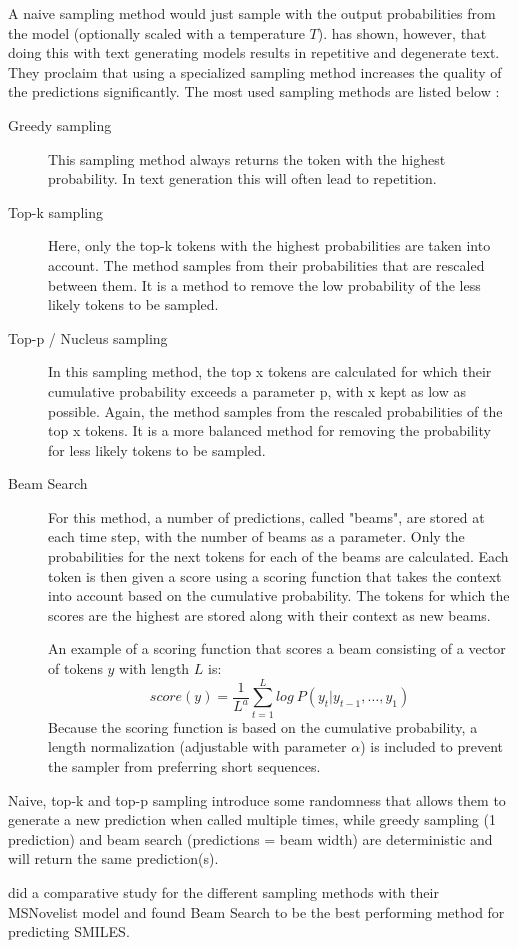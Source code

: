 A naive sampling method would just sample with the output probabilities from the model (optionally scaled with a temperature $T$). \textcite{holtzman2019curious} has shown, however, that doing this with text generating models results in repetitive and degenerate text. They proclaim that using a specialized sampling method increases the quality of the predictions significantly.
The most used sampling methods are listed below \cite{holtzman2019curious}:
\begin{description}
    \item[Greedy sampling] This sampling method always returns the token with the highest probability. In text generation this will often lead to repetition.
    \item[Top-k sampling] Here, only the top-k tokens with the highest probabilities are taken into account. The method samples from their probabilities that are rescaled between them. It is a method to remove the low probability of the less likely tokens to be sampled.
    \item[Top-p / Nucleus sampling] In this sampling method, the top x tokens are calculated for which their cumulative probability exceeds a parameter p, with x kept as low as possible. Again, the method samples from the rescaled probabilities of the top x tokens. It is a more balanced method for removing the probability for less likely tokens to be sampled.
    \item[Beam Search] \cite{freitag2017beam} For this method, a number of predictions, called "beams", are stored at each time step, with the number of beams as a parameter. Only the probabilities for the next tokens for each of the beams are calculated. Each token is then given a score using a scoring function that takes the context into account based on the cumulative probability. The tokens for which the scores are the highest are stored along with their context as new beams.

    An example of a scoring function that scores a beam consisting of a vector of tokens $y$ with length $L$ is:
    \[score(y) = \frac{1}{L^a} \sum\limits_{t=1}^{L}log\ P(y_t | y_{t-1},\dots,y_{1})\]
    Because the scoring function is based on the cumulative probability, a length normalization (adjustable with parameter $\alpha$) is included to prevent the sampler from preferring short sequences.
    
\end{description}

Naive, top-k and top-p sampling introduce some randomness that allows them to generate a new prediction when called multiple times, while greedy sampling (1 prediction) and beam search (predictions = beam width) are deterministic and will return the same prediction(s).

\textcite{stravs2022msnovelist} did a comparative study for the different sampling methods with their MSNovelist model and found Beam Search to be the best performing method for predicting SMILES.
